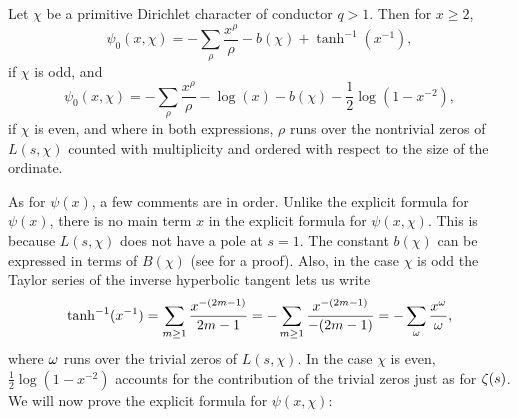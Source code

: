     \begin{theorem*}
      Let $\chi$ be a primitive Dirichlet character of conductor $q > 1$. Then for $x \ge 2$,
      \[
        \psi_{0}(x,\chi) = -\sum_{\rho}\frac{x^{\rho}}{\rho}-b(\chi)+\tanh^{-1}(x^{-1}),
      \]
      if $\chi$ is odd, and
      \[
        \psi_{0}(x,\chi) = -\sum_{\rho}\frac{x^{\rho}}{\rho}-\log(x)-b(\chi)-\frac{1}{2}\log(1-x^{-2}),
      \]
      if $\chi$ is even, and where in both expressions, $\rho$ runs over the nontrivial zeros of $L(s,\chi)$ counted with multiplicity and ordered with respect to the size of the ordinate.
    \end{theorem*}

    As for $\psi(x)$, a few comments are in order. Unlike the explicit formula for $\psi(x)$, there is no main term $x$ in the explicit formula for $\psi(x,\chi)$. This is because $L(s,\chi)$ does not have a pole at $s = 1$. The constant $b(\chi)$ can be expressed in terms of $B(\chi)$ (see \cite{davenport1980multiplicative} for a proof). Also, in the case $\chi$ is odd the Taylor series of the inverse hyperbolic tangent lets us write
    \[
      \tanh^{-1}(x^{-1}) = \sum_{m \ge 1}\frac{x^{-(2m-1)}}{2m-1} = -\sum_{m \ge 1}\frac{x^{-(2m-1)}}{-(2m-1)} = -\sum_{\omega}\frac{x^{\omega}}{\omega},
    \]
    where $\omega$ runs over the trivial zeros of $L(s,\chi)$. In the case $\chi$ is even, $\frac{1}{2}\log(1-x^{-2})$ accounts for the contribution of the trivial zeros just as for $\zeta(s)$. We will now prove the explicit formula for $\psi(x,\chi)$:

